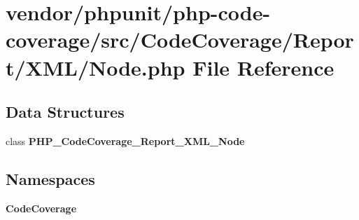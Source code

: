 \section{vendor/phpunit/php-\/code-\/coverage/src/\+Code\+Coverage/\+Report/\+X\+M\+L/\+Node.php File Reference}
\label{phpunit_2php-code-coverage_2src_2_code_coverage_2_report_2_x_m_l_2_node_8php}
\subsection*{Data Structures}
\begin{DoxyCompactItemize}
\item 
class {\bf P\+H\+P\+\_\+\+Code\+Coverage\+\_\+\+Report\+\_\+\+X\+M\+L\+\_\+\+Node}
\end{DoxyCompactItemize}
\subsection*{Namespaces}
\begin{DoxyCompactItemize}
\item 
 {\bf Code\+Coverage}
\end{DoxyCompactItemize}

